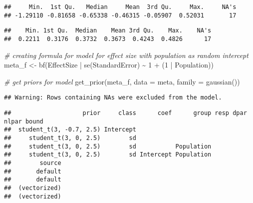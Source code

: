 \documentclass[
]{article}
\newenvironment{Shaded}{\begin{snugshade}}{\end{snugshade}}
\newcommand{\AttributeTok}[1]{\textcolor[rgb]{0.77,0.63,0.00}{#1}}
\newcommand{\CommentTok}[1]{\textcolor[rgb]{0.56,0.35,0.01}{\textit{#1}}}
\newcommand{\DecValTok}[1]{\textcolor[rgb]{0.00,0.00,0.81}{#1}}
\newcommand{\FunctionTok}[1]{\textcolor[rgb]{0.00,0.00,0.00}{#1}}
\newcommand{\NormalTok}[1]{#1}
\newcommand{\OtherTok}[1]{\textcolor[rgb]{0.56,0.35,0.01}{#1}}
\newcommand{\SpecialCharTok}[1]{\textcolor[rgb]{0.00,0.00,0.00}{#1}}
\begin{document}
\begin{verbatim}
##     Min.  1st Qu.   Median     Mean  3rd Qu.     Max.     NA's 
## -1.29110 -0.81658 -0.65338 -0.46315 -0.05907  0.52031       17
\end{verbatim}

\begin{Shaded}
\end{Shaded}

\begin{verbatim}
##    Min. 1st Qu.  Median    Mean 3rd Qu.    Max.    NA's 
##  0.2211  0.3176  0.3732  0.3673  0.4243  0.4826      17
\end{verbatim}

\begin{Shaded}
\begin{Highlighting}[]
\CommentTok{\# creating formula for model for effect size with population as random intercept}
\NormalTok{meta\_f }\OtherTok{\textless{}{-}} \FunctionTok{bf}\NormalTok{(EffectSize }\SpecialCharTok{|} \FunctionTok{se}\NormalTok{(StandardError) }\SpecialCharTok{\textasciitilde{}} \DecValTok{1} \SpecialCharTok{+}\NormalTok{ (}\DecValTok{1} \SpecialCharTok{|}\NormalTok{ Population))}

\CommentTok{\# get priors for model}
\FunctionTok{get\_prior}\NormalTok{(meta\_f, }\AttributeTok{data =}\NormalTok{ meta, }\AttributeTok{family =} \FunctionTok{gaussian}\NormalTok{())}
\end{Highlighting}
\end{Shaded}

\begin{verbatim}
## Warning: Rows containing NAs were excluded from the model.
\end{verbatim}

\begin{verbatim}
##                    prior     class      coef      group resp dpar nlpar bound
##  student_t(3, -0.7, 2.5) Intercept                                           
##     student_t(3, 0, 2.5)        sd                                           
##     student_t(3, 0, 2.5)        sd           Population                      
##     student_t(3, 0, 2.5)        sd Intercept Population                      
##        source
##       default
##       default
##  (vectorized)
##  (vectorized)
\end{verbatim}
\end{document}
